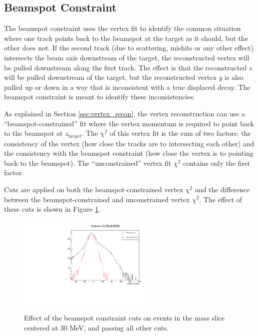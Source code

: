 \subsection{Beamspot Constraint}
The beamspot constraint uses the vertex fit to identify the common situation where one track points back to the beamspot at the target as it should, but the other does not.
If the second track (due to scattering, mishits or any other effect) intersects the beam axis downstream of the target, the reconstructed vertex will be pulled downstream along the first track.
The effect is that the reconstructed $z$ will be pulled downstream of the target, but the reconstructed vertex $y$ is also pulled up or down in a way that is inconsistent with a true displaced decay.
The beamspot constraint is meant to identify these inconsistencies.

As explained in Section \ref{sec:vertex_recon}, the vertex reconstruction can use a ``beamspot-constrained'' fit where the vertex momentum is required to point back to the beamspot at $z_{target}$.
The $\chi^2$ of this vertex fit is the sum of two factors: the consistency of the vertex (how close the tracks are to intersecting each other) and the consistency with the beamspot constraint (how close the vertex is to pointing back to the beamspot).
The ``unconstrained'' vertex fit $\chi^2$ contains only the first factor.

Cuts are applied on both the beamspot-constrained vertex $\chi^2$ and the difference between the beamspot-constrained and unconstrained vertex $\chi^2$.
The effect of these cuts is shown in Figure \ref{fig:bsc_performance}.

\begin{figure}[ht]
\begin{center}
    \includegraphics[width=0.6\textwidth,page=4,angle=-90]{vertexing/figs/vertcutplots}
\end{center}
    \caption{Effect of the beamspot constraint cuts on events in the mass slice centered at 30 MeV, and passing all other cuts.
    }
    \label{fig:bsc_performance}
\end{figure}


